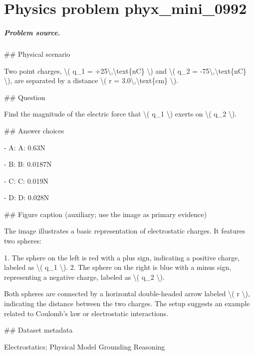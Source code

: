 
\chapter{Physics problem phyx\_mini\_0992}
\label{ch:PhyXMiniProblems_problem_phyx_mini_0992}

\paragraph{Problem source.}
\#\# Physical scenario

Two point charges, \textbackslash{}( q\_1 = +25\textbackslash{},\textbackslash{}text\{nC\} \textbackslash{}) and \textbackslash{}( q\_2 = -75\textbackslash{},\textbackslash{}text\{nC\} \textbackslash{}), are separated by a distance \textbackslash{}( r = 3.0\textbackslash{},\textbackslash{}text\{cm\} \textbackslash{}).

\#\# Question

Find the magnitude of the electric force that \textbackslash{}( q\_1 \textbackslash{}) exerts on \textbackslash{}( q\_2 \textbackslash{}).

\#\# Answer choices

- A: A: 0.63N

- B: B: 0.0187N

- C: C: 0.019N

- D: D: 0.028N

\#\# Figure caption (auxiliary; use the image as primary evidence)

The image illustrates a basic representation of electrostatic charges. It features two spheres:

1. The sphere on the left is red with a plus sign, indicating a positive charge, labeled as \textbackslash{}( q\_1 \textbackslash{}).
2. The sphere on the right is blue with a minus sign, representing a negative charge, labeled as \textbackslash{}( q\_2 \textbackslash{}).

Both spheres are connected by a horizontal double-headed arrow labeled \textbackslash{}( r \textbackslash{}), indicating the distance between the two charges. The setup suggests an example related to Coulomb's law or electrostatic interactions.

\#\# Dataset metadata

Electrostatics; Physical Model Grounding Reasoning

